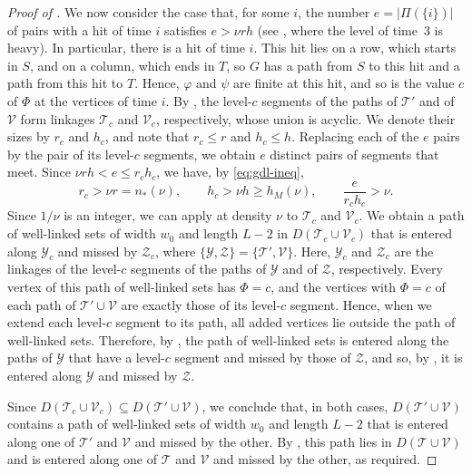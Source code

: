 \documentclass[fontsize=12pt,leading=14pt]{fullpaper}
\newcommand{\Tcal}{\mathcal{T}}
\newcommand{\Vcal}{\mathcal{V}}
\newcommand{\Ycal}{\mathcal{Y}}
\newcommand{\Zcal}{\mathcal{Z}}
\begin{document}
\begin{proof}[Proof of ]
  We now consider the case that, for some $i$, the number $e=|\Pi(\{i\})|$ of pairs with a hit of time $i$ satisfies $e>\nu rh$ (see , where the level of time~$3$ is heavy).
  In particular, there is a hit of time $i$.
  This hit lies on a row, which starts in $S$, and on a column, which ends in $T$, so $G$ has a path from $S$ to this hit and a path from this hit to $T$.
  Hence, $\varphi$ and $\psi$ are finite at this hit, and so is the value $c$ of $\Phi$ at the vertices of time $i$.
  By , the level-$c$ segments of the paths of $\Tcal'$ and of $\Vcal$ form linkages $\Tcal_c$ and $\Vcal_c$, respectively, whose union is acyclic.
  We denote their sizes by $r_c$ and $h_c$, and note that $r_c\le r$ and $h_c\le h$.
  Replacing each of the $e$ pairs by the pair of its level-$c$ segments, we obtain $e$ distinct pairs of segments that meet.
  Since $\nu rh<e\le r_ch_c$, we have, by \eqref{eq:gdl-ineq},
  \[
    r_c>\nu r=n_*(\nu),\qquad
    h_c>\nu h\ge h_M(\nu),\qquad
    \frac{e}{r_ch_c}>\nu.
  \]
  Since $1/\nu$ is an integer, we can apply  at density $\nu$ to $\Tcal_c$ and $\Vcal_c$.
  We obtain a path of well-linked sets of width $w_0$ and length $L-2$ in $D(\Tcal_c\cup\Vcal_c)$ that is entered along $\Ycal_c$ and missed by $\Zcal_c$, where $\{\Ycal,\Zcal\}=\{\Tcal',\Vcal\}$.
  Here, $\Ycal_c$ and $\Zcal_c$ are the linkages of the level-$c$ segments of the paths of $\Ycal$ and of $\Zcal$, respectively.
  Every vertex of this path of well-linked sets has $\Phi=c$, and the vertices with $\Phi=c$ of each path of $\Tcal'\cup\Vcal$ are exactly those of its level-$c$ segment.
  Hence, when we extend each level-$c$ segment to its path, all added vertices lie outside the path of well-linked sets.
  Therefore, by , the path of well-linked sets is entered along the paths of $\Ycal$ that have a level-$c$ segment and missed by those of $\Zcal$, and so, by , it is entered along $\Ycal$ and missed by $\Zcal$.

  Since $D(\Tcal_c\cup\Vcal_c)\subseteq D(\Tcal'\cup\Vcal)$, we conclude that, in both cases, $D(\Tcal'\cup\Vcal)$ contains a path of well-linked sets of width $w_0$ and length $L-2$ that is entered along one of $\Tcal'$ and $\Vcal$ and missed by the other.
  By , this path lies in $D(\Tcal\cup\Vcal)$ and is entered along one of $\Tcal$ and $\Vcal$ and missed by the other, as required.
\end{proof}
\end{document}
